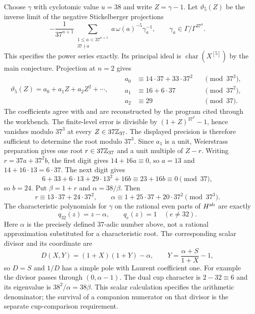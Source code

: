 Choose $\gamma$ with cyclotomic value $u=38$ and write $Z=\gamma-1$.
Let $\vartheta_5(Z)$ be the inverse limit of the negative
Stickelberger projections
\[
 -\frac1{37^{n+1}}
 \sum_{\substack{1\leq a<37^{n+1}\\37\nmid a}}
 a\,\omega(a)^{-5}\gamma_a^{-1},
 \qquad
 \gamma_a\in\Gamma/\Gamma^{37^n}.
\]
This specifies the power series exactly. Its principal ideal is
$\operatorname{char}(X^{[5]})$ by the main conjecture.
Projection at $n=2$ gives
\[
 \vartheta_5(Z)=a_0+a_1Z+a_2Z^2+\cdots,
 \qquad
 \begin{aligned}
 a_0&\equiv14\cdot37+33\cdot37^2&&\pmod{37^3},\\
 a_1&\equiv16+6\cdot37&&\pmod{37^2},\\
 a_2&\equiv29&&\pmod{37}.
 \end{aligned}
\]
The coefficients agree with \cite[\S1.9, p.~8]{Wuthrich} and are
reconstructed by the program cited through the workbench.
The finite-level error is divisible by $(1+Z)^{37^2}-1$, hence
vanishes modulo $37^3$ at every $Z\in37\mathbb Z_{37}$.
The displayed precision is therefore sufficient to determine the root
modulo $37^3$. Since $a_1$ is a unit, Weierstrass preparation gives
one root $r\in37\mathbb Z_{37}$ and a unit multiple of $Z-r$.
Writing $r=37a+37^2b$, the first digit gives $14+16a\equiv0$, so
$a=13$ and $14+16\cdot13=6\cdot37$. The next digit gives
\[
 6+33+6\cdot13+29\cdot13^2+16b
       \equiv23+16b\equiv0\pmod{37},
\]
so $b=24$. Put $\beta=1+r$ and $\alpha=38/\beta$. Then
\[
 r\equiv13\cdot37+24\cdot37^2,\qquad
 \alpha\equiv1+25\cdot37+20\cdot37^2\pmod{37^3}.
\]
The characteristic polynomials for $\gamma$ on the rational even
parts of $H^{\rm ab}$ are exactly
\[
 q_{32}(z)=z-\alpha,\qquad q_e(z)=1\quad(e\ne32).
\]
Here $\alpha$ is the precisely defined $37$-adic number above,
not a rational approximation substituted for a characteristic root.
The corresponding scalar divisor and its coordinate are
\[
 D(X,Y)=(1+X)(1+Y)-\alpha,\qquad
 Y=\frac{\alpha+S}{1+X}-1,
\]
so $D=S$ and $1/D$ has a simple pole with Laurent coefficient one.
For example the divisor passes through $(0,\alpha-1)$.
The dual cup character is $2-32\equiv6$ and its eigenvalue is
$38^2/\alpha=38\beta$. This scalar calculation specifies the
arithmetic denominator; the survival of a companion numerator
on that divisor is the separate cup-comparison requirement.
